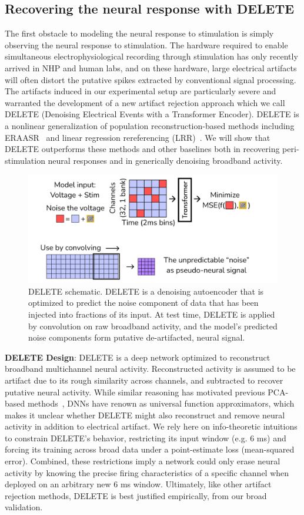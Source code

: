 \documentclass[12pt,oneside]{report}
\begin{document}
\subsection*{Recovering the neural response with DELETE}
The first obstacle to modeling the neural response to stimulation is simply observing the neural response to stimulation. The hardware required to enable simultaneous electrophysiological recording through stimulation has only recently arrived in NHP and human labs, and on these hardware, large electrical artifacts will often distort the putative spikes extracted by conventional signal processing. The artifacts induced in our experimental setup are particularly severe and warranted the development of a new artifact rejection approach which we call DELETE (Denoising Electrical Events with a Transformer Encoder). DELETE is a nonlinear generalization of population reconstruction-based methods including ERAASR~\citep{oshea2018eraasr} and linear regression rereferencing (LRR)~\citep{young2018signal}.  We will show that DELETE outperforms these methods and other baselines both in recovering peri-stimulation neural responses and in generically denoising broadband activity.

\begin{figure}[h]
  \centering
  \includegraphics[width=0.8\linewidth]{ch4_delete_schema.png}
  \caption{DELETE schematic. DELETE is a denoising autoencoder that is optimized to predict the noise component of data that has been injected into fractions of its input. At test time, DELETE is applied by convolution on raw broadband activity, and the model's predicted noise components form putative de-artifacted, neural signal.}
  \label{fig:delete_schema}
\end{figure}


\textbf{DELETE Design}: DELETE is a deep network optimized to reconstruct broadband multichannel neural activity. Reconstructed activity is assumed to be artifact due to its rough similarity across channels, and subtracted to recover putative neural activity. While similar reasoning has motivated previous PCA-based methods~\citep{oshea2018eraasr}, DNNs have renown as universal function approximators, which makes it unclear whether DELETE might also reconstruct and remove neural activity in addition to electrical artifact. We rely here on info-theoretic intuitions to constrain DELETE’s behavior, restricting its input window (e.g. 6 ms) and forcing its training across broad data under a point-estimate loss (mean-squared error). Combined, these restrictions imply a network could only erase neural activity by knowing the precise firing characteristics of a specific channel when deployed on an arbitrary new 6 ms window. Ultimately, like other artifact rejection methods, DELETE is best justified empirically, from our broad validation.
\end{document}

